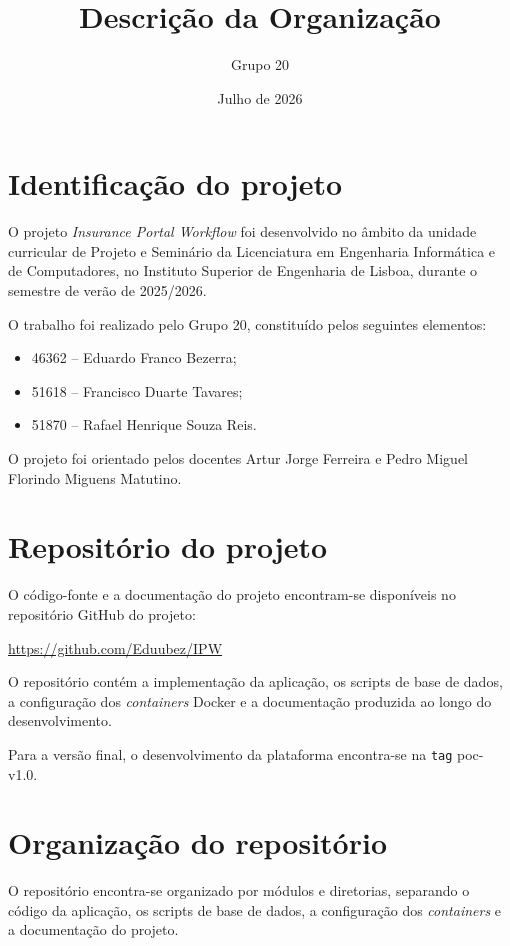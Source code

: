 \documentclass[11pt,a4paper]{article}
\title{Descrição da Organização}
\author{Grupo 20}
\date{Julho de 2026}
\begin{document}
\maketitle

\section{Identificação do projeto}

O projeto \textit{Insurance Portal Workflow} foi desenvolvido no âmbito da unidade curricular de Projeto e Seminário da Licenciatura em Engenharia Informática e de Computadores, no Instituto Superior de Engenharia de Lisboa, durante o semestre de verão de 2025/2026.

O trabalho foi realizado pelo Grupo 20, constituído pelos seguintes elementos:

\begin{itemize}
  \item 46362 -- Eduardo Franco Bezerra;
  \item 51618 -- Francisco Duarte Tavares;
  \item 51870 -- Rafael Henrique Souza Reis.
\end{itemize}

O projeto foi orientado pelos docentes Artur Jorge Ferreira e Pedro Miguel Florindo Miguens Matutino.

\section{Repositório do projeto}

O código-fonte e a documentação do projeto encontram-se disponíveis no repositório GitHub do projeto:

\begin{center}
  \url{https://github.com/Eduubez/IPW}
\end{center}

O repositório contém a implementação da aplicação, os scripts de base de dados, a configuração dos \textit{containers} Docker e a documentação produzida ao longo do desenvolvimento.

Para a versão final, o desenvolvimento da plataforma encontra-se na \texttt{tag} poc-v1.0.

\section{Organização do repositório}

O repositório encontra-se organizado por módulos e diretorias, separando o código da aplicação, os scripts de base de dados, a configuração dos \textit{containers} e a documentação do projeto.
\end{document}
